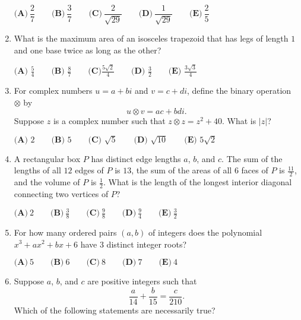 \documentclass{article}
\begin{document}
\begin{enumerate}[label=\arabic*., itemsep=0.5em]
\(\textbf{(A)}\ \dfrac{2}{7} \qquad\textbf{(B)}\ \dfrac{3}{7}  \qquad\textbf{(C)}\ \dfrac{2}{\sqrt{29}}  \qquad\textbf{(D)}\ \dfrac{1}{\sqrt{29}}  \qquad\textbf{(E)}\ \dfrac{2}{5}\)\par \vspace{0.5em}\item What is the maximum area of an isosceles trapezoid that has legs of length \(1\) and one base twice as long as the other?

\(\textbf{(A) }\frac 54 \qquad \textbf{(B) } \frac 87 \qquad \textbf{(C)} \frac{5\sqrt2}4 \qquad \textbf{(D) } \frac 32  \qquad \textbf{(E) } \frac{3\sqrt3}4\)\par \vspace{0.5em}\item For complex numbers \(u=a+bi\) and \(v=c+di\), define the binary operation \(\otimes\) by
\begin{equation*}
u\otimes v=ac+bdi.
\end{equation*}
Suppose \(z\) is a complex number such that \(z\otimes z=z^{2}+40\). What is \(|z|\)?

\(\textbf{(A) }2\qquad\textbf{(B) }5\qquad\textbf{(C) }\sqrt{5}\qquad\textbf{(D) }\sqrt{10}\qquad\textbf{(E) }5\sqrt{2}\)\par \vspace{0.5em}\item A rectangular box \(P\) has distinct edge lengths \(a\), \(b\), and \(c\). The sum of the lengths of all \(12\) edges of \(P\) is \(13\), the sum of the areas of all \(6\) faces of \(P\) is \(\frac{11}{2}\), and the volume of \(P\) is \(\frac{1}{2}\). What is the length of the longest interior diagonal connecting two vertices of \(P\)?

\(\textbf{(A)}~2\qquad\textbf{(B)}~\frac{3}{8}\qquad\textbf{(C)}~\frac{9}{8}\qquad\textbf{(D)}~\frac{9}{4}\qquad\textbf{(E)}~\frac{3}{2}\)\par \vspace{0.5em}\item For how many ordered pairs \((a,b)\) of integers does the polynomial \(x^3+ax^2+bx+6\) have \(3\) distinct integer roots?

\(\textbf{(A)}\ 5 \qquad\textbf{(B)}\ 6 \qquad\textbf{(C)}\ 8 \qquad\textbf{(D)}\ 7 \qquad\textbf{(E)}\ 4\)\par \vspace{0.5em}\item Suppose \(a\), \(b\), and \(c\) are positive integers such that
\begin{equation*}
\frac{a}{14}+\frac{b}{15}=\frac{c}{210}.
\end{equation*}
Which of the following statements are necessarily true?


\end{enumerate}
\end{document}
